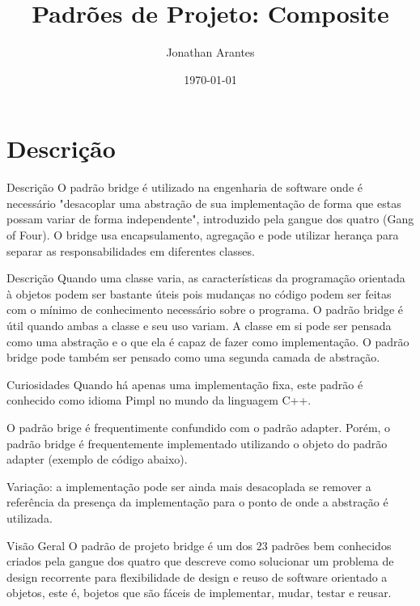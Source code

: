 \documentclass{beamer}
\title{Padrões de Projeto: Composite}
\date{\today}
\author{Jonathan Arantes}
\institute{Instituto Federal de Minas Gerais - Campus Formiga}
\begin{document}
  \lstset{basicstyle=\tiny,style=JavaStyle}
  \maketitle
  \section{Descrição}
  \begin{frame}{Descrição}
O padrão bridge é utilizado na engenharia de software onde é necessário "desacoplar uma abstração de sua implementação de forma que estas possam variar de forma independente", introduzido pela gangue dos quatro (Gang of Four). O bridge usa encapsulamento, agregação e pode utilizar herança para separar as responsabilidades em diferentes classes.
  \end{frame}

  \begin{frame}{Descrição}
Quando uma classe varia, as características da programação orientada à objetos podem ser bastante úteis pois mudanças no código podem ser feitas com o mínimo de conhecimento necessário sobre o programa. O padrão bridge é útil quando ambas a classe e seu uso variam. A classe em si pode ser pensada como uma abstração e o que ela é capaz de fazer como implementação. O padrão bridge pode também ser pensado como uma segunda camada de abstração.
  \end{frame}

  \begin{frame}{Curiosidades}
Quando há apenas uma implementação fixa, este padrão é conhecido como idioma Pimpl no mundo da linguagem C++.

O padrão brige é frequentimente confundido com o padrão adapter. Porém, o padrão bridge é frequentemente implementado utilizando o objeto do padrão adapter (exemplo de código abaixo).

Variação: a implementação pode ser ainda mais desacoplada se remover a referência da presença da implementação para o ponto de onde a abstração é utilizada.
  \end{frame}

  \begin{frame}{Visão Geral}
O padrão de projeto bridge é um dos 23 padrões bem conhecidos criados pela gangue dos quatro que descreve como solucionar um problema de design recorrente para flexibilidade de design e reuso de software orientado a objetos, este é, bojetos que são fáceis de implementar, mudar, testar e reusar.
  \end{frame}
\end{document}
